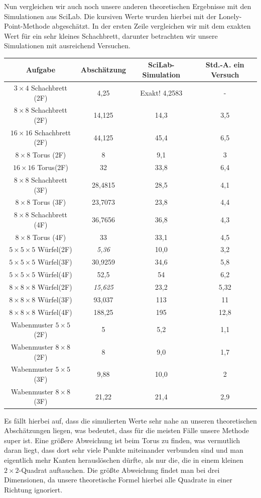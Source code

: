 \documentclass[11pt,a4paper]{article}
\numberwithin{equation}{section}
\numberwithin{table}{section}
\numberwithin{figure}{section}
\begin{document}
Nun vergleichen wir auch noch unsere anderen theoretischen Ergebnisse mit den Simulationen aus SciLab. Die kursiven Werte wurden hierbei mit der Lonely-Point-Methode abgeschätzt. In der ersten Zeile vergleichen wir mit dem exakten Wert für ein sehr kleines Schachbrett, darunter betrachten wir unsere Simulationen mit ausreichend Versuchen.
\begin{center}
\begin{tabular}{|c|c|c|c|}
\hline 
Aufgabe & Abschätzung & SciLab-Simulation & Std.-A. ein Versuch \\ 
\hline \hline
$3 \times 4$ Schachbrett (2F) & 4,25 & Exakt! 4,2583 & - \\ 
\hline 
$8 \times 8$ Schachbrett (2F) & 14,125 & 14,3 & 3,5 \\ 
\hline 
$16 \times 16$ Schachbrett (2F) & 44,125 & 45,4 & 6,5 \\ 
\hline 
$8 \times 8$ Torus (2F) & 8 & 9,1 & 3 \\ 
\hline 
$16 \times 16$ Torus(2F) & 32 & 33,8 & 6,4 \\ 
\hline 
$8 \times 8$ Schachbrett (3F) & 28,4815 & 28,5 & 4,1 \\ 
\hline 
$8 \times 8$ Torus (3F) & 23,7073 & 23,8 & 4,4 \\ 
\hline 
$8 \times 8$ Schachbrett (4F) & 36,7656 & 36,8 & 4,3	 \\ 
\hline 
$8 \times 8$ Torus (4F) & 33 & 33,1 & 4,5 \\ 
\hline 
$5 \times 5 \times 5$ Würfel(2F) & \textit{5,36} & 10,0 & 3,2 \\
\hline
$5 \times 5 \times 5$ Würfel(3F) & 30,9259 & 34,6 & 5,8 \\
\hline
$5 \times 5 \times 5$ Würfel(4F) & 52,5 & 54 & 6,2 \\
\hline 
$8 \times 8 \times 8$ Würfel(2F) & \textit{15,625} & 23,2 & 5,32 \\
\hline
$8 \times 8 \times 8$ Würfel(3F) & 93,037 & 113 & 11 \\
\hline
$8 \times 8 \times 8$ Würfel(4F) & 188,25 & 195 & 12,8 \\
\hline
Wabenmuster $5 \times 5$ (2F) & 5 & 5,2 & 1,1 \\ 
\hline 
Wabenmuster $8 \times 8$ (2F) & 8 & 9,0 & 1,7 \\ 
\hline 
Wabenmuster $5 \times 5$ (3F) & 9,88 & 10,0 & 2 \\ 
\hline 
Wabenmuster $8 \times 8$ (3F) & 21,22 & 21,4 & 2,9 \\ 
\hline 
\end{tabular} 
\end{center}
Es fällt hierbei	 auf, dass die simulierten Werte sehr nahe an unseren theoretischen Abschät\-zun\-gen liegen, was bedeutet, dass für die meisten Fälle unsere Methode super ist. Eine größere Abweichung ist beim Torus zu finden, was vermutlich daran liegt, dass dort sehr viele Punkte miteinander verbunden sind und man eigentlich mehr Kanten herauslöschen dürfte, als nur die, die in einem kleinen $2\times 2$-Quadrat auftauchen. Die größte Abweichung findet man bei drei Dimensionen, da unsere theoretische Formel hierbei alle Quadrate in einer Richtung ignoriert.
\end{document}
